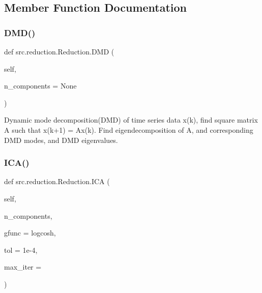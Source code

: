 \subsection{Member Function Documentation}
\mbox{\label{classsrc_1_1reduction_1_1Reduction_a4caf2d9ebcae694c40cd1a53b839dbea}} 
\subsubsection{\texorpdfstring{D\+M\+D()}{DMD()}}
{\footnotesize\ttfamily def src.\+reduction.\+Reduction.\+D\+MD (\begin{DoxyParamCaption}\item[{}]{self,  }\item[{}]{n\+\_\+components = {\ttfamily None} }\end{DoxyParamCaption})}

\begin{DoxyVerb}Dynamic mode decomposition(DMD) of time series data x(k), find square 
matrix A such that x(k+1) = Ax(k). Find eigendecomposition of A, and 
corresponding DMD modes, and DMD eigenvalues.\end{DoxyVerb}
 \mbox{\label{classsrc_1_1reduction_1_1Reduction_aeae4617e67a22994d2e8432eba840cde}} 
\subsubsection{\texorpdfstring{I\+C\+A()}{ICA()}}
{\footnotesize\ttfamily def src.\+reduction.\+Reduction.\+I\+CA (\begin{DoxyParamCaption}\item[{}]{self,  }\item[{}]{n\+\_\+components,  }\item[{}]{gfunc = {\ttfamily \textquotesingle{}logcosh\textquotesingle{}},  }\item[{}]{tol = {\ttfamily 1e-\/4},  }\item[{}]{max\+\_\+iter = {} }\end{DoxyParamCaption})}

